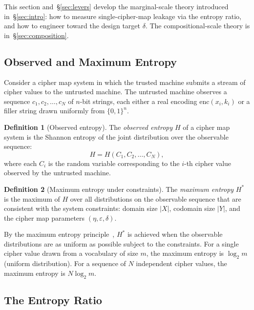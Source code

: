 \documentclass[conference]{IEEEtran}
\theoremstyle{definition}
\newtheorem{definition}{Definition}[section]
\theoremstyle{plain}
\theoremstyle{remark}
\newcommand{\enc}{\mathrm{enc}}
\newcommand{\B}{\{0,1\}}
\begin{document}
This section and~\S\ref{sec:levers} develop the marginal-scale theory
introduced in~\S\ref{sec:intro}: how to measure single-cipher-map
leakage via the entropy ratio, and how to engineer toward the design
target $\delta$.  The compositional-scale theory is in~\S\ref{sec:composition}.

\subsection{Observed and Maximum Entropy}

Consider a cipher map system in which the trusted machine submits a
stream of cipher values to the untrusted machine.  The untrusted machine
observes a sequence $c_1, c_2, \ldots, c_N$ of $n$-bit strings, each
either a real encoding $\enc(x_i, k_i)$ or a filler string drawn
uniformly from $\B^n$.

\begin{definition}[Observed entropy]
\label{def:observed-entropy}
The \emph{observed entropy} $H$ of a cipher map system is the Shannon
entropy of the joint distribution over the observable sequence:
\begin{equation}
H = H(C_1, C_2, \ldots, C_N),
\end{equation}
where each $C_i$ is the random variable corresponding to the $i$-th
cipher value observed by the untrusted machine.
\end{definition}

\begin{definition}[Maximum entropy under constraints]
\label{def:max-entropy}
The \emph{maximum entropy} $H^*$ is the maximum of $H$ over all
distributions on the observable sequence that are consistent with the
system constraints: domain size $|X|$, codomain size $|Y|$, and the
cipher map parameters $(\eta, \varepsilon, \delta)$.
\end{definition}

By the maximum entropy principle~\cite{jaynes1957information}, $H^*$ is
achieved when the observable distributions are as uniform as possible
subject to the constraints.  For a single cipher value drawn from a
vocabulary of size $m$, the maximum entropy is $\log_2 m$ (uniform
distribution).  For a sequence of $N$ independent cipher values, the
maximum entropy is $N \log_2 m$.

\subsection{The Entropy Ratio}
\end{document}

